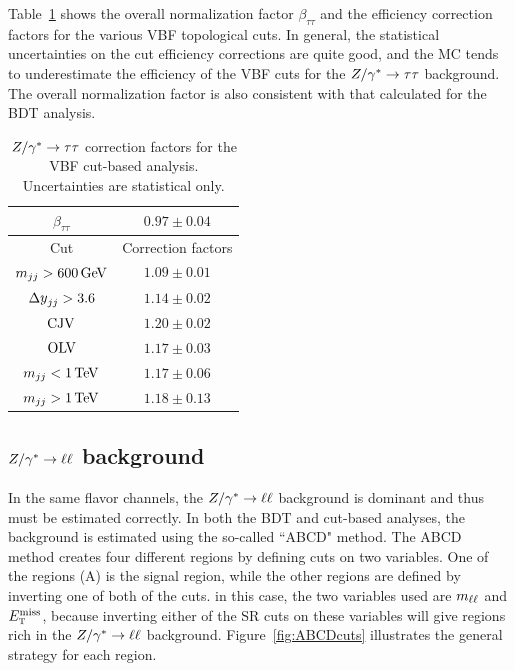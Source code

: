 Table~\ref{tab:vbf_cb_zttnf} shows the overall normalization factor $\beta_{\tau\tau}$ and the efficiency correction factors for the various VBF topological cuts. In general, the statistical uncertainties on the cut efficiency corrections are quite good, and the MC tends to underestimate the efficiency of the VBF cuts for the $Z/\gamma^{\ast}\to\tau\tau$ background. The overall normalization factor is also consistent with that calculated for the BDT analysis.

\begin{table}[h!]
\centering
\captionsetup{justification=centering}
\begin{tabular}{|c|c|}
\hline
$\beta_{\tau\tau}$ & $0.97 \pm 0.04$ \\ \hline\hline
 Cut & Correction factors \\ \hline
$\mjj > 600 \GeV$ & $1.09 \pm 0.01$ \\ \hline
$\dyjj > 3.6 $ & $1.14 \pm 0.02$ \\ \hline
$\rm CJV$ & $1.20 \pm 0.02$ \\ \hline
$\rm OLV$ & $1.17 \pm 0.03$ \\ \hline
$\mjj < 1 \TeV$ & $1.17 \pm 0.06$ \\ \hline
$\mjj > 1 \TeV$ & $1.18 \pm 0.13$ \\ \hline 
\end{tabular}
\caption{$Z/\gamma^{\ast} \to\tau\tau$ correction factors for the VBF cut-based analysis. Uncertainties are statistical only.}
\label{tab:vbf_cb_zttnf}
\end{table}

\subsection{$Z/\gamma^{\ast} \to \ell\ell$ background}

In the same flavor channels, the $Z/\gamma^{\ast} \to \ell\ell$ background is dominant and thus must be estimated correctly. In both the BDT and cut-based analyses, the background is estimated using the so-called ``ABCD" method. The ABCD method creates four different regions by defining cuts on two variables. One of the regions (A) is the signal region, while the other regions are defined by inverting one of both of the cuts. in this case, the two variables used are $m_{\ell\ell}$ and $E_{\textrm{\footnotesize\sc t}}^{\rm miss}$, because inverting either of the SR cuts on these variables will give regions rich in the $Z/\gamma^{\ast}\to\ell\ell$ background. Figure~\ref{fig:ABCDcuts} illustrates the general strategy for each region. 


